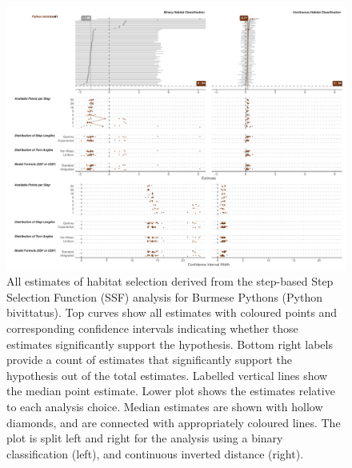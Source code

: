 \documentclass[10pt,a4paper]{article}
\begin{document}
\begin{figure}
\includegraphics[width=1\linewidth]{../../figures/specCurve_Python bivittatus_ssf} \caption{All estimates of habitat selection derived from the step-based Step Selection Function (SSF) analysis for Burmese Pythons (Python bivittatus). Top curves show all estimates with coloured points and corresponding confidence intervals indicating whether those estimates significantly support the hypothesis. Bottom right labels provide a count of estimates that significantly support the hypothesis out of the total estimates. Labelled vertical lines show the median point estimate. Lower plot shows the estimates relative to each analysis choice. Median estimates are shown with hollow diamonds, and are connected with appropriately coloured lines. The plot is split left and right for the analysis using a binary classification (left), and continuous inverted distance (right).}\label{fig:specCurveSsfPYBI}
\end{figure}
\end{document}
